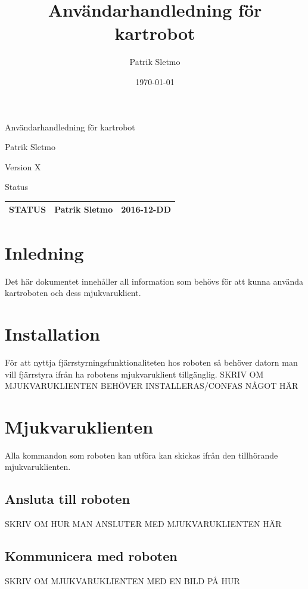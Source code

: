\documentclass{article}
\title{Användarhandledning för kartrobot}
\author{Patrik Sletmo}
\date{\today}
\begin{document}
\thispagestyle{empty}

{
\sffamily
\centering
\large


{\huge 
Användarhandledning för kartrobot
}

{\large
Patrik Sletmo
}

{\large
Version X
}

\vspace{3.5cm}

Status
\begin{table}[H]
\centering
\begin{tabular}{ | c | c | c | }
\hline
STATUS & Patrik Sletmo & 2016-12-DD \\
\hline
\end{tabular}
\end{table}
}
\clearpage

\section{Inledning}
Det här dokumentet innehåller all information som behövs för att kunna  använda kartroboten och dess mjukvaruklient. 

\section{Installation}
För att nyttja fjärrstyrningsfunktionaliteten hos roboten så behöver datorn man vill fjärrstyra ifrån ha robotens mjukvaruklient tillgänglig. SKRIV OM MJUKVARUKLIENTEN BEHÖVER INSTALLERAS/CONFAS NÅGOT HÄR

\section{Mjukvaruklienten}
Alla kommandon som roboten kan utföra kan skickas ifrån den tillhörande mjukvaruklienten.

\subsection{Ansluta till roboten}
SKRIV OM HUR MAN ANSLUTER MED MJUKVARUKLIENTEN HÄR 

\subsection{Kommunicera med roboten}
SKRIV OM MJUKVARUKLIENTEN MED EN BILD PÅ HUR 

\nocite{*}
{}

\end{document}
